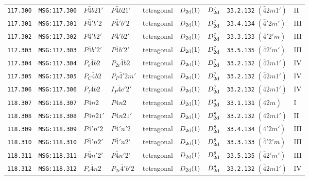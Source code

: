 \documentclass[fleqn,10pt]{jsarticle}
\begin{document}
\begin{center}
\begin{longtable}{lllllllll}
\texttt{117.300} & \texttt{MSG:117.300} & $P\bar{4}b21'$ & $P\bar{4}b21'$ & tetragonal & $D_{\rm 2d}(1)$ & $D_{\rm 2d}^{7}$ & \texttt{33.2.132} $(\bar{4}2m1')$ & II \\
\texttt{117.301} & \texttt{MSG:117.301} & $P\bar{4}'b'2$ & $P\bar{4}'b'2$ & tetragonal & $D_{\rm 2d}(1)$ & $D_{\rm 2d}^{7}$ & \texttt{33.4.134} $(\bar{4}'2m')$ & III \\
\texttt{117.302} & \texttt{MSG:117.302} & $P\bar{4}'b2'$ & $P\bar{4}'b2'$ & tetragonal & $D_{\rm 2d}(1)$ & $D_{\rm 2d}^{7}$ & \texttt{33.3.133} $(\bar{4}'2'm)$ & III \\
\texttt{117.303} & \texttt{MSG:117.303} & $P\bar{4}b'2'$ & $P\bar{4}b'2'$ & tetragonal & $D_{\rm 2d}(1)$ & $D_{\rm 2d}^{7}$ & \texttt{33.5.135} $(\bar{4}2'm')$ & III \\
\texttt{117.304} & \texttt{MSG:117.304} & $P_{c}\bar{4}b2$ & $P_{2c}\bar{4}b2$ & tetragonal & $D_{\rm 2d}(1)$ & $D_{\rm 2d}^{7}$ & \texttt{33.2.132} $(\bar{4}2m1')$ & IV \\
\texttt{117.305} & \texttt{MSG:117.305} & $P_{C}\bar{4}b2$ & $P_{P}\bar{4}'2m'$ & tetragonal & $D_{\rm 2d}(1)$ & $D_{\rm 2d}^{7}$ & \texttt{33.2.132} $(\bar{4}2m1')$ & IV \\
\texttt{117.306} & \texttt{MSG:117.306} & $P_{I}\bar{4}b2$ & $I_{P}\bar{4}c'2'$ & tetragonal & $D_{\rm 2d}(1)$ & $D_{\rm 2d}^{7}$ & \texttt{33.2.132} $(\bar{4}2m1')$ & IV \\ \hline
\texttt{118.307} & \texttt{MSG:118.307} & $P\bar{4}n2$ & $P\bar{4}n2$ & tetragonal & $D_{\rm 2d}(1)$ & $D_{\rm 2d}^{8}$ & \texttt{33.1.131} $(\bar{4}2m)$ & I \\
\texttt{118.308} & \texttt{MSG:118.308} & $P\bar{4}n21'$ & $P\bar{4}n21'$ & tetragonal & $D_{\rm 2d}(1)$ & $D_{\rm 2d}^{8}$ & \texttt{33.2.132} $(\bar{4}2m1')$ & II \\
\texttt{118.309} & \texttt{MSG:118.309} & $P\bar{4}'n'2$ & $P\bar{4}'n'2$ & tetragonal & $D_{\rm 2d}(1)$ & $D_{\rm 2d}^{8}$ & \texttt{33.4.134} $(\bar{4}'2m')$ & III \\
\texttt{118.310} & \texttt{MSG:118.310} & $P\bar{4}'n2'$ & $P\bar{4}'n2'$ & tetragonal & $D_{\rm 2d}(1)$ & $D_{\rm 2d}^{8}$ & \texttt{33.3.133} $(\bar{4}'2'm)$ & III \\
\texttt{118.311} & \texttt{MSG:118.311} & $P\bar{4}n'2'$ & $P\bar{4}n'2'$ & tetragonal & $D_{\rm 2d}(1)$ & $D_{\rm 2d}^{8}$ & \texttt{33.5.135} $(\bar{4}2'm')$ & III \\
\texttt{118.312} & \texttt{MSG:118.312} & $P_{c}\bar{4}n2$ & $P_{2c}\bar{4}'b'2$ & tetragonal & $D_{\rm 2d}(1)$ & $D_{\rm 2d}^{8}$ & \texttt{33.2.132} $(\bar{4}2m1')$ & IV \\

\end{longtable}
\end{center}
\end{document}
